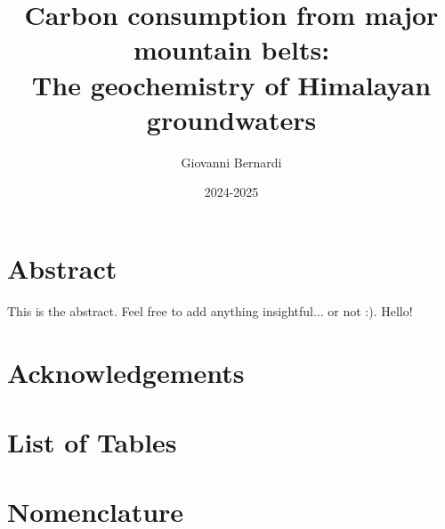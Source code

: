 \documentclass[hidelinks, 12pt]{article} %
\title{
  \vspace{-1cm}
  \textbf{Carbon consumption from major mountain belts: \\
  The geochemistry of Himalayan groundwaters}
  \vspace{0.5cm}
}
\author{Giovanni Bernardi}
\date{2024-2025}
\begin{document}

\maketitle





\thispagestyle{empty}

\newpage

\section*{Abstract}
\label{sec:abstract}

This is the abstract. Feel free to add anything insightful... or not :). Hello!



\newpage


\thispagestyle{empty}

\tableofcontents

\newpage

\thispagestyle{empty}

\section*{Acknowledgements}

\newpage

\thispagestyle{empty}

\section*{List of Tables}

\newpage

\thispagestyle{empty}

\section*{Nomenclature}

\newpage




\FloatBarrier
{}





\newpage




\newpage





\newpage





\newpage





\newpage




\end{document}
